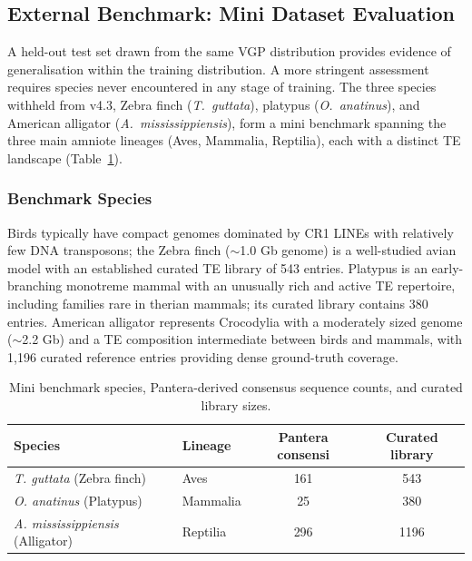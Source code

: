 \documentclass[12pt]{article}
\begin{document}
\fi

\subsection{External Benchmark: Mini Dataset Evaluation}\label{ssec:mini_benchmark}

A held-out test set drawn from the same VGP distribution provides evidence of generalisation within the training distribution. A more stringent assessment requires species never encountered in any stage of training. The three species withheld from v4.3, Zebra finch (\textit{T.~guttata}), platypus (\textit{O.~anatinus}), and American alligator (\textit{A.~mississippiensis}), form a mini benchmark spanning the three main amniote lineages (Aves, Mammalia, Reptilia), each with a distinct TE landscape (Table~\ref{tab:mini_benchmark_species}).

\subsubsection{Benchmark Species}

Birds typically have compact genomes dominated by CR1 LINEs with relatively few DNA transposons; the Zebra finch ($\sim$1.0 Gb genome) is a well-studied avian model with an established curated TE library of 543 entries. Platypus is an early-branching monotreme mammal with an unusually rich and active TE repertoire, including families rare in therian mammals; its curated library contains 380 entries. American alligator represents Crocodylia with a moderately sized genome ($\sim$2.2 Gb) and a TE composition intermediate between birds and mammals, with 1,196 curated reference entries providing dense ground-truth coverage.

\begin{table}[h]
\centering
\begin{tabular}{llcc}
\hline
Species & Lineage & Pantera consensi & Curated library \\
\hline
\textit{T. guttata} (Zebra finch) & Aves & 161 & 543 \\
\textit{O. anatinus} (Platypus) & Mammalia & 25 & 380 \\
\textit{A. mississippiensis} (Alligator) & Reptilia & 296 & 1196 \\
\hline
\end{tabular}
\caption{Mini benchmark species, Pantera-derived consensus sequence counts, and curated library sizes.}
\label{tab:mini_benchmark_species}
\end{table}
\end{document}

